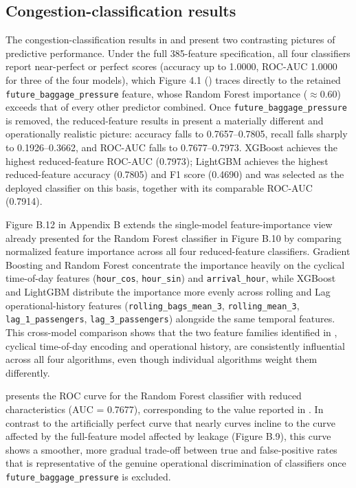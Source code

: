 \subsection{Congestion-classification results}
\label{subsec:congestion-classification-results}

The congestion-classification results in  and  present two contrasting pictures of predictive performance. Under the full 385-feature specification, all four classifiers report near-perfect or perfect scores (accuracy up to 1.0000, ROC-AUC 1.0000 for three of the four models), which Figure 4.1 () traces directly to the retained \nolinkurl{future_baggage_pressure} feature, whose Random Forest importance ($\approx 0.60$) exceeds that of every other predictor combined. Once \nolinkurl{future_baggage_pressure} is removed, the reduced-feature results in  present a materially different and operationally realistic picture: accuracy falls to 0.7657--0.7805, recall falls sharply to 0.1926--0.3662, and ROC-AUC falls to 0.7677--0.7973. XGBoost achieves the highest reduced-feature ROC-AUC (0.7973); LightGBM achieves the highest reduced-feature accuracy (0.7805) and F1 score (0.4690) and was selected as the deployed classifier on this basis, together with its comparable ROC-AUC (0.7914).

Figure B.12 in Appendix B extends the single-model feature-importance view already presented for the Random Forest classifier in Figure B.10 by comparing normalized feature importance across all four reduced-feature classifiers. Gradient Boosting and Random Forest concentrate the importance heavily on the cyclical time-of-day features (\nolinkurl{hour_cos}, \nolinkurl{hour_sin}) and \nolinkurl{arrival_hour}, while XGBoost and LightGBM distribute the importance more evenly across rolling and Lag operational-history features (\nolinkurl{rolling_bags_mean_3}, \nolinkurl{rolling_mean_3}, \nolinkurl{lag_1_passengers}, \nolinkurl{lag_3_passengers}) alongside the same temporal features. This cross-model comparison shows that the two feature families identified in , cyclical time-of-day encoding and operational history, are consistently influential across all four algorithms, even though individual algorithms weight them differently.

 presents the ROC curve for the Random Forest classifier with reduced characteristics (AUC = 0.7677), corresponding to the value reported in . In contrast to the artificially perfect curve that nearly curves incline to the curve affected by the full-feature model affected by leakage (Figure B.9), this curve shows a smoother, more gradual trade-off between true and false-positive rates that is representative of the genuine operational discrimination of classifiers once \nolinkurl{future_baggage_pressure} is excluded.

